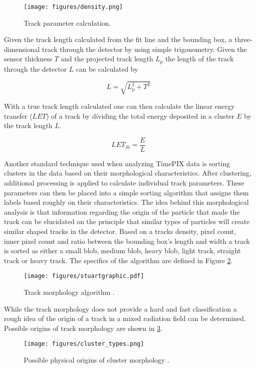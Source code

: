 \begin{figure}[H]
	\begin{center}
	\texttt{[image: figures/density.png]}
	\caption{Track parameter calculation.\cite{stuartthesis}}
	\label{track_analysis}
	\end{center}
\end{figure}

Given the track length calculated from the fit line and the bounding box, a three-dimensional track through the detector by using simple trigonometry. Given the sensor thickness $T$ and the projected track length $L_{p}$ the length of the track through the detector $L$ can be calculated by

\[L = \sqrt{L_{p}^{2} + T^{2}} \]

With a true track length calculated one can then calculate the linear energy transfer ($LET$) of a track by dividing the total energy deposited in a cluster $E$ by the track length $L$.

\[LET_{Si} = \frac{E}{L}\]

Another standard technique used when analyzing TimePIX data is sorting clusters in the data based on their morphological characteristics. After clustering, additional processing is applied to calculate individual track parameters. These parameters can then be placed into a simple sorting algorithm that assigns them labels based roughly on their characteristics. The idea behind this morphological analysis is that information regarding the origin of the particle that made the track can be elucidated on the principle that similar types of particles will create similar shaped tracks in the detector. Based on a tracks density, pixel count, inner pixel count and ratio between the bounding box's length and width a track is sorted as either a small blob, medium blob, heavy blob, light track, straight track or heavy track. The specifics of the algorithm are defined in Figure \ref{stuart_algo}.

\begin{figure}[H]
	\begin{center}
	\texttt{[image: figures/stuartgraphic.pdf]}
	\caption{Track morphology algorithm \cite{stuartalgo}.}
	\label{stuart_algo}
	\end{center}
\end{figure}

While the track morphology does not provide a hard and fast classification a rough idea of the origin of a track in a mixed radiation field can be determined. Possible origins of track morphology are shown in \ref{track_morphology}.

\begin{figure}[H]
	\begin{center}
	\texttt{[image: figures/cluster\_types.png]}
	\caption{Possible physical origins of cluster morphology \cite{stuartthesis}.}
	\label{track_morphology}
	\end{center}
\end{figure}
